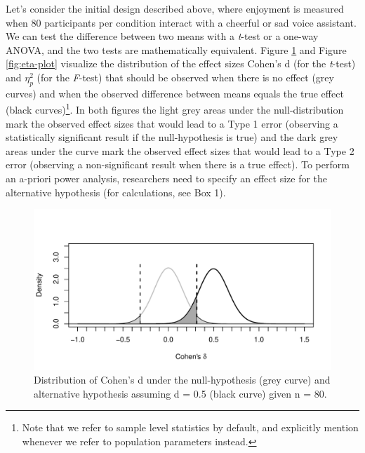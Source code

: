 \documentclass[,man,floatsintext]{apa6}
\let\rmarkdownfootnote\footnote%
\def\footnote{\protect\rmarkdownfootnote}
\begin{document}
Let's consider the initial design described above, where enjoyment is measured when 80 participants per condition interact with a cheerful or sad voice assistant.
We can test the difference between two means with a \emph{t}-test or a one-way ANOVA, and the two tests are mathematically equivalent.
Figure \ref{fig:d-plot} and Figure \ref{fig:eta-plot} visualize the distribution of the effect sizes Cohen's d (for the \emph{t}-test) and \(\eta_p^2\) (for the \emph{F}-test) that should be observed when there is no effect (grey curves) and when the observed difference between means equals the true effect (black curves)\footnote{Note that we refer to sample level statistics by default, and explicitly mention whenever we refer to population parameters instead.}.
In both figures the light grey areas under the null-distribution mark the observed effect sizes that would lead to a Type 1 error (observing a statistically significant result if the null-hypothesis is true) and the dark grey areas under the curve mark the observed effect sizes that would lead to a Type 2 error (observing a non-significant result when there is a true effect).
To perform an a-priori power analysis, researchers need to specify an effect size for the alternative hypothesis (for calculations, see Box 1).

\begin{figure}
\centering
\includegraphics{0.1_Simulation_Based_Power_Analysis_For_Factorial_ANOVA_Designs_files/figure-latex/d-plot-1.pdf}
\caption{\label{fig:d-plot}Distribution of Cohen's d under the null-hypothesis (grey curve) and alternative hypothesis assuming d = 0.5 (black curve) given n = 80.}
\end{figure}
\end{document}
